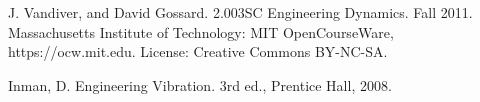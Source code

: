 \begin{thebibliography}{99}



\bibitem{}
J. Vandiver, and David Gossard. 2.003SC Engineering Dynamics. Fall 2011. Massachusetts Institute of Technology: MIT OpenCourseWare, https://ocw.mit.edu. License: Creative Commons BY-NC-SA.

\bibitem{}
Inman, D. Engineering Vibration. 3rd ed., Prentice Hall, 2008.

\end{thebibliography}


